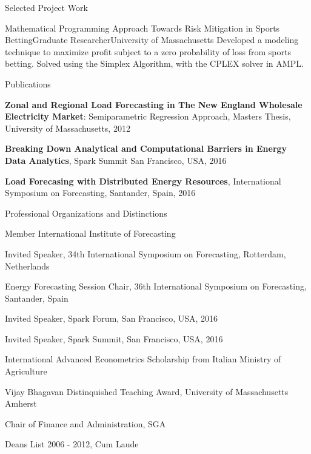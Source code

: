 \documentclass{resume} %
\begin{document}
\begin{rSection}{Selected Project Work}
	\begin{rSubsection}{Mathematical Programming Approach Towards Risk Mitigation in Sports Betting}{}{Graduate Researcher}{University of Massachusetts}
	Developed a modeling technique to maximize profit subject to a zero probability of loss from sports betting. Solved using the Simplex Algorithm, with the CPLEX solver in AMPL.
	\end{rSubsection} 

	\end{rSection}
	


  \begin{rSection}{Publications}
  \item {\bf  Zonal and Regional Load Forecasting in The New England Wholesale Electricity Market}: Semiparametric Regression Approach, Masters Thesis, University of Massachusetts, 2012
  \item {\bf Breaking Down Analytical and Computational Barriers in Energy Data Analytics}, Spark Summit San Francisco, USA, 2016
  \item {\bf Load Forecasing with Distributed Energy Resources}, International Symposium on Forecasting, Santander, Spain, 2016
  
  \end{rSection}



	\begin{rSection}{Professional Organizations and Distinctions}

  \item Member International Institute of Forecasting
  \item Invited Speaker, 34th International Symposium on Forecasting, Rotterdam, Netherlands
  \item Energy Forecasting Session Chair, 36th International Symposium on Forecasting, Santander, Spain
  \item Invited Speaker, Spark Forum, San Francisco, USA, 2016
  \item Invited Speaker, Spark Summit, San Francisco, USA, 2016
  \item International Advanced Econometrics Scholarship from Italian Ministry of Agriculture
  \item Vijay Bhagavan Distinquished Teaching Award, University of Massachusetts Amherst
  \item Chair of Finance and Administration, SGA
  \item Deans List 2006 - 2012, Cum Laude

	\end{rSection}

	
\end{document}
